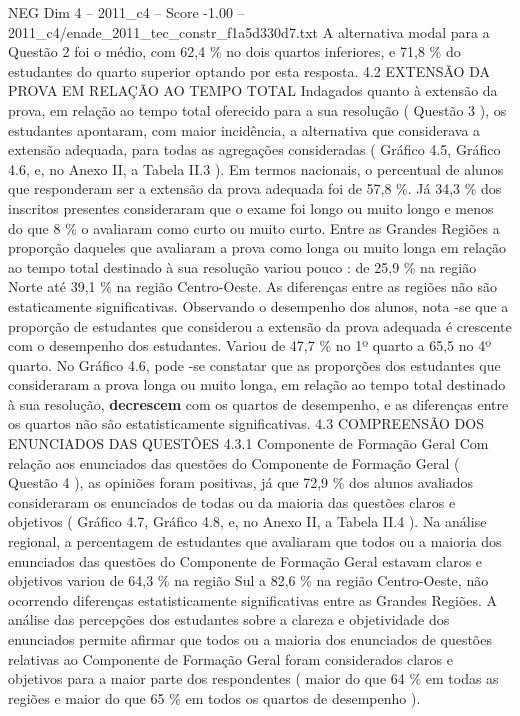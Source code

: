 \begin{textsample}{NEG Dim 4 – 2011\_c4 – Score -1.00 – 2011\_c4/enade\_2011\_tec\_constr\_f1a5d330d7.txt}
A alternativa modal para a Questão 2 foi o médio, com 62,4 \% no dois quartos inferiores, e 71,8 \% do estudantes do quarto superior optando por esta resposta. 4.2 EXTENSÃO DA PROVA EM RELAÇÃO AO TEMPO TOTAL Indagados quanto à extensão da prova, em relação ao tempo total oferecido para a sua resolução ( Questão 3 ), os estudantes apontaram, com maior incidência, a alternativa que considerava a extensão adequada, para todas as agregações consideradas ( Gráfico 4.5, Gráfico 4.6, e, no Anexo II, a Tabela II.3 ).
Em termos nacionais, o percentual de alunos que responderam ser a extensão da prova adequada foi de 57,8 \%.
Já 34,3 \% dos inscritos presentes consideraram que o exame foi longo ou muito longo e menos do que 8 \% o avaliaram como curto ou muito curto.
Entre as Grandes Regiões a proporção daqueles que avaliaram a prova como longa ou muito longa em relação ao tempo total destinado à sua resolução variou pouco : de 25,9 \% na região Norte até 39,1 \% na região Centro-Oeste.
As diferenças entre as regiões não são estaticamente significativas.
Observando o desempenho dos alunos, nota -se que a proporção de estudantes que considerou a extensão da prova adequada é crescente com o desempenho dos estudantes.
Variou de 47,7 \% no 1º quarto a 65,5 no 4º quarto.
No Gráfico 4.6, pode -se constatar que as proporções dos estudantes que consideraram a prova longa ou muito longa, em relação ao tempo total destinado à sua resolução, \textbf{decrescem} com os quartos de desempenho, e as diferenças entre os quartos não são estatisticamente significativas. 4.3 COMPREENSÃO DOS ENUNCIADOS DAS QUESTÕES 4.3.1 Componente de Formação Geral Com relação aos enunciados das questões do Componente de Formação Geral ( Questão 4 ), as opiniões foram positivas, já que 72,9 \% dos alunos avaliados consideraram os enunciados de todas ou da maioria das questões claros e objetivos ( Gráfico 4.7, Gráfico 4.8, e, no Anexo II, a Tabela II.4 ).
Na análise regional, a percentagem de estudantes que avaliaram que todos ou a maioria dos enunciados das questões do Componente de Formação Geral estavam claros e objetivos variou de 64,3 \% na região Sul a 82,6 \% na região Centro-Oeste, não ocorrendo diferenças estatisticamente significativas entre as Grandes Regiões.
A análise das percepções dos estudantes sobre a clareza e objetividade dos enunciados permite afirmar que todos ou a maioria dos enunciados de questões relativas ao Componente de Formação Geral foram considerados claros e objetivos para a maior parte dos respondentes ( maior do que 64 \% em todas as regiões e maior do que 65 \% em todos os quartos de desempenho ).

\end{textsample}
